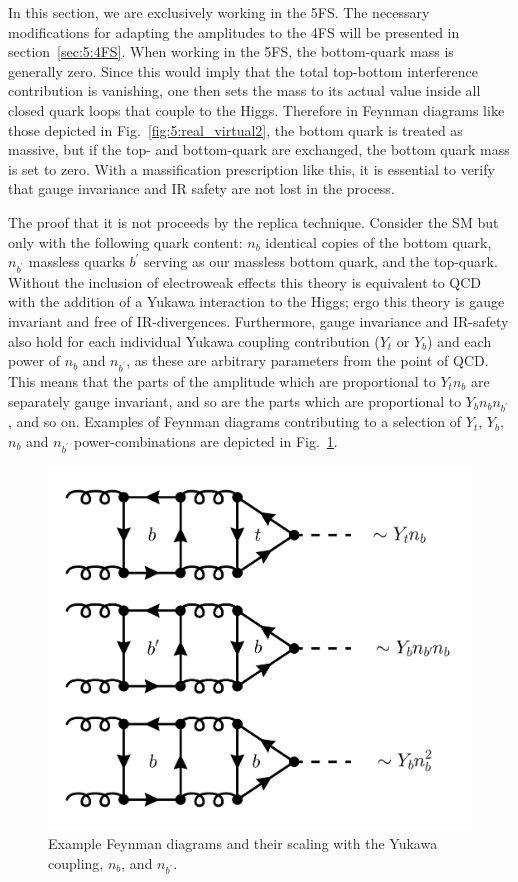 In this section, we are exclusively working in the 5\acs{FS}. The necessary modifications for adapting the amplitudes to the 4\acs{FS} will be presented in section~\ref{sec:5:4FS}. When working in the 5\acs{FS}, the bottom-quark mass is generally zero. Since this would imply that the total top-bottom interference contribution is vanishing, one then sets the mass to its actual value inside all closed quark loops that couple to the Higgs. Therefore in Feynman diagrams like those depicted in Fig.~\ref{fig:5:real_virtual2}, the bottom quark is treated as massive, but if the top- and bottom-quark are exchanged, the bottom quark mass is set to zero. With a massification prescription like this, it is essential to verify that gauge invariance and \acs{IR} safety are not lost in the process.

The proof that it is not proceeds by the replica technique. Consider the \acs{SM} but only with the following quark content: $n_b$ identical copies of the bottom quark, $n_{b^\prime}$ massless quarks $b^\prime$ serving as our massless bottom quark, and the top-quark. Without the inclusion of electroweak effects this theory is equivalent to \acs{QCD} with the addition of a Yukawa interaction to the Higgs; ergo this theory is gauge invariant and free of \acs{IR}-divergences. Furthermore, gauge invariance and \acs{IR}-safety also hold for each individual Yukawa coupling contribution ($Y_t$ or $Y_b$) and each power of $n_b$ and $n_{b^\prime}$, as these are arbitrary parameters from the point of \acs{QCD}. This means that the parts of the amplitude which are proportional to $Y_t n_b$ are separately gauge invariant, and so are the parts which are proportional to $Y_b n_b n_{b^\prime}$, and so on. Examples of Feynman diagrams contributing to a selection of $Y_t$, $Y_b$, $n_b$ and $n_{b^\prime}$ power-combinations are depicted in Fig.~\ref{fig:5:replica}.
\begin{figure}[h]
\centering
\includegraphics[scale=0.21]{Images/NNLO_Feynman_diagrams/replica.pdf}
\caption{Example Feynman diagrams and their scaling with the Yukawa coupling, $n_b$, and $n_{b^\prime}$.}
\label{fig:5:replica}
\end{figure}
